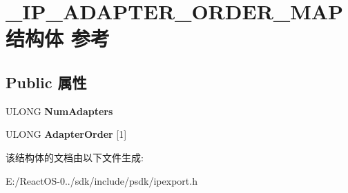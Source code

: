 \hypertarget{struct___i_p___a_d_a_p_t_e_r___o_r_d_e_r___m_a_p}{}\section{\+\_\+\+I\+P\+\_\+\+A\+D\+A\+P\+T\+E\+R\+\_\+\+O\+R\+D\+E\+R\+\_\+\+M\+A\+P结构体 参考}
\label{struct___i_p___a_d_a_p_t_e_r___o_r_d_e_r___m_a_p}
\subsection*{Public 属性}
\begin{DoxyCompactItemize}
\item 
\mbox{\label{struct___i_p___a_d_a_p_t_e_r___o_r_d_e_r___m_a_p_acf1a6afc30e2b616adbe632c8693e262}} 
U\+L\+O\+NG {\bfseries Num\+Adapters}
\item 
\mbox{\label{struct___i_p___a_d_a_p_t_e_r___o_r_d_e_r___m_a_p_a3c02882700fde17f4e650b1a81bd232f}} 
U\+L\+O\+NG {\bfseries Adapter\+Order} \mbox{[}1\mbox{]}
\end{DoxyCompactItemize}


该结构体的文档由以下文件生成\+:\begin{DoxyCompactItemize}
\item 
E\+:/\+React\+O\+S-\/0../sdk/include/psdk/ipexport.\+h\end{DoxyCompactItemize}

